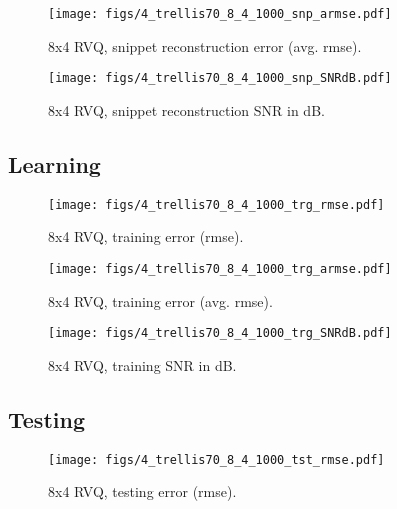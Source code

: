 								\begin{figure}[h!]
								\centering
								\texttt{[image: figs/4\_trellis70\_8\_4\_1000\_snp\_armse.pdf]}
								\caption{8x4 RVQ, snippet reconstruction error (avg. rmse).}
								\label{fig:4_trellis70_8_4_1000_snp_armse}
								\end{figure}

								\begin{figure}[h!]
								\centering
								\texttt{[image: figs/4\_trellis70\_8\_4\_1000\_snp\_SNRdB.pdf]}
								\caption{8x4 RVQ, snippet reconstruction SNR in dB.}
								\label{fig:4_trellis70_8_4_1000_snp_SNRdB}
								\end{figure}
\clearpage
\newpage
\subsection{Learning}
								\begin{figure}[h!]
								\centering
								\texttt{[image: figs/4\_trellis70\_8\_4\_1000\_trg\_rmse.pdf]}
								\caption{8x4 RVQ, training error (rmse).}
								\label{fig:4_trellis70_8_4_1000_trg_rmse}
								\end{figure}


								\begin{figure}[h!]
								\centering
								\texttt{[image: figs/4\_trellis70\_8\_4\_1000\_trg\_armse.pdf]}
								\caption{8x4 RVQ, training error (avg. rmse).}
								\label{fig:4_trellis70_8_4_1000_trg_armse}
								\end{figure}

								\begin{figure}[h!]
								\centering
								\texttt{[image: figs/4\_trellis70\_8\_4\_1000\_trg\_SNRdB.pdf]}
								\caption{8x4 RVQ, training SNR in dB.}
								\label{fig:4_trellis70_8_4_1000_trg_SNRdB}
								\end{figure}
\clearpage
\newpage
\subsection{Testing}
								\begin{figure}[h!]
								\centering
								\texttt{[image: figs/4\_trellis70\_8\_4\_1000\_tst\_rmse.pdf]}
								\caption{8x4 RVQ, testing error (rmse).}
								\label{fig:4_trellis70_8_4_1000_tst_rmse}
								\end{figure}


